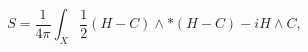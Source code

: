 \begin{equation}
 S = \frac{1}{4 \pi} \int_X \frac{1}{2} (H - C) \wedge * (H - C) - i H \wedge C,
\end{equation}

